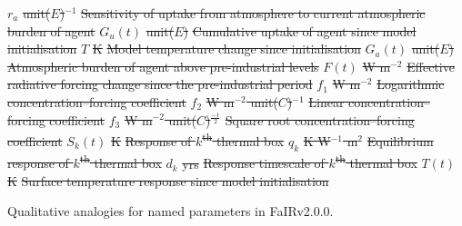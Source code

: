 \documentclass[gmd, manuscript]{copernicus}
\providecommand{\DIFadd}[1]{{\protect\color{blue}#1}} %
\providecommand{\DIFdel}[1]{{\protect\color{red}\sout{#1}}}                      %
\providecommand{\DIFaddbegin}{} %
\providecommand{\DIFaddend}{} %
\providecommand{\DIFdelend}{} %
\providecommand{\DIFaddFL}[1]{\DIFadd{#1}} %
\begin{document}
\DIFdel{$r_a$ }%
\DIFdel{unit($E$)$^{-1}$ }%
\DIFdel{Sensitivity of uptake from atmosphere to current atmospheric burden of agent}%
\DIFdel{$G_u(t)$ }%
\DIFdel{unit($E$) }%
\DIFdel{Cumulative uptake of agent since model initialisation}%
\DIFdel{$T$ }%
\DIFdel{K }%
\DIFdel{Model temperature change since initialisation}%
\DIFdel{$G_a(t)$ }%
\DIFdel{unit($E$) }%
\DIFdel{Atmospheric burden of agent above pre-industrial levels}%
\DIFdel{$F(t)$ }%
\DIFdel{W m$^{-2}$ }%
\DIFdel{Effective radiative forcing change since the pre-industrial period}%
\DIFdel{$f_1$ }%
\DIFdel{W m$^{-2}$ }%
\DIFdel{Logarithmic concentration--forcing coefficient}%
\DIFdel{$f_2$ }%
\DIFdel{W m$^{-2}$ unit($C$)$^{-1}$ }%
\DIFdel{Linear concentration--forcing coefficient}%
\DIFdel{$f_3$ }%
\DIFdel{W m$^{-2}$ unit($C$)$^{\frac{-1}{2}}$ }%
\DIFdel{Square root concentration--forcing coefficient}%
\DIFdel{$S_k(t)$ }%
\DIFdel{K }%
\DIFdel{Response of $k$\textsuperscript{th} thermal box}%
\DIFdel{$q_k$ }%
\DIFdel{K W$^{-1}$ m$^{2}$ }%
\DIFdel{Equilibrium response of $k$\textsuperscript{th} thermal box}%
\DIFdel{$d_k$ }%
\DIFdel{yrs }%
\DIFdel{Response timescale of $k$\textsuperscript{th} thermal box}%
\DIFdel{$T(t)$ }%
\DIFdel{K }%
\DIFdel{Surface temperature response since model initialisation}%
\DIFdelend \DIFaddbegin \begin{table}[t]
    \caption{\DIFaddFL{Qualitative analogies for named parameters in FaIRv2.0.0.}}
    \label{table:p_analogies}
    
\end{table}
\clearpage
\DIFaddend %
\end{document}
